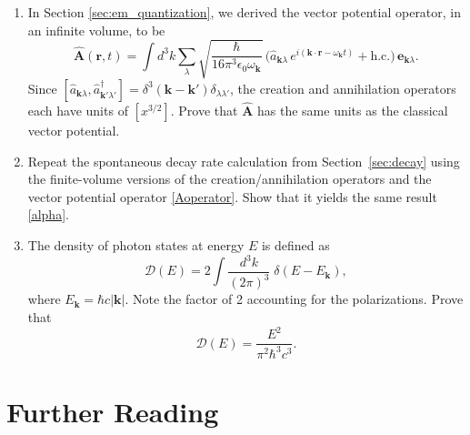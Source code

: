 \documentclass[prx,12pt]{revtex4-2}
\begin{document}
\begin{enumerate}
\item
  In Section \ref{sec:em_quantization}, we derived the vector
  potential operator, in an infinite volume, to be
  \begin{equation}
    \hat{\mathbf{A}}(\mathbf{r},t) = \int d^3k \sum_{\lambda} 
  \sqrt{\frac{\hbar}{16\pi^3\epsilon_0\omega_{\mathbf{k}}}}\,
  \Big(\hat{a}_{\mathbf{k}\lambda} \, e^{i(\mathbf{k}\cdot\mathbf{r} - \omega_{\mathbf{k}} t)}
  + \mathrm{h.c.}\Big)\, \mathbf{e}_{\mathbf{k}\lambda}.
  \end{equation}
  Since $[\hat{a}_{\mathbf{k}\lambda},
    \hat{a}^\dagger_{\mathbf{k}'\lambda'}] =
  \delta^3(\mathbf{k}-\mathbf{k}') \delta_{\lambda\lambda'}$, the
  creation and annihilation operators each have units of $[x^{3/2}]$.
  Prove that $\hat{\mathbf{A}}$ has the same units as the classical
  vector potential.

\item Repeat the spontaneous decay rate calculation from
  Section~\ref{sec:decay} using the finite-volume versions of the
  creation/annihilation operators and the vector potential operator
  \eqref{Aoperator}.  Show that it yields the same result
  \eqref{alpha}.
  \label{ex:alpha_finite}

\item
  The density of photon states at energy $E$ is defined as
  \begin{equation}
    \mathcal{D}(E) = 2\int \frac{d^3k}{(2\pi)^3}\; \delta(E-E_{\mathbf{k}}),
  \end{equation}
  where $E_{\mathbf{k}} = \hbar c |\mathbf{k}|$.  Note the factor of 2
  accounting for the polarizations.  Prove that
  \begin{equation}
    \mathcal{D}(E) = \frac{E^2}{\pi^2\hbar^3c^3}.
  \end{equation}
  \label{ex:DE}

\end{enumerate}

\section*{Further Reading}
\end{document}
